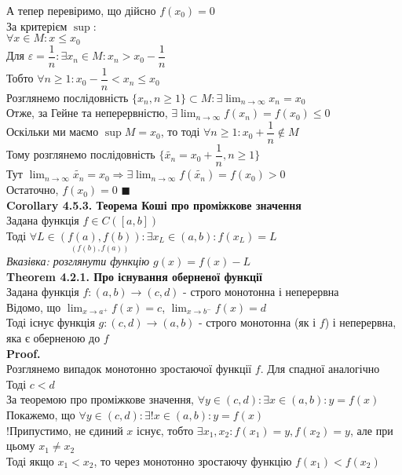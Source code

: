 \documentclass[a4paper, 14pt]{extarticle}
\def\huge{\displaystyle}
\def\bigline{\vspace{5mm}\\}
\def\th#1{\textbf{Theorem {#1}}}
\def\crl#1{\textbf{Corollary {#1}}}
\def\proof{\textbf{Proof.}\\}
\def\bigline{\vspace{5mm}\\}
\def\qed{$\blacksquare$}
\begin{document}
А тепер перевіримо, що дійсно $f(x_0) = 0$\\
За критерієм $\sup$:\\
$\forall x \in M: x \leq x_0$\\
Для $\varepsilon = \dfrac{1}{n}: \exists x_n \in M: x_n > x_0 - \dfrac{1}{n}$\\
Тобто $\forall n \geq 1: x_0 - \dfrac{1}{n} < x_n \leq x_0$\\
Розглянемо послідовність $\{x_n, n \geq 1\} \subset M: \exists \huge \lim_{n \to \infty} x_n = x_0$\\
Отже, за Гейне та неперервністю, $\huge \exists \lim_{n \to \infty} f(x_n) = f(x_0) \leq 0$
\\
Оскільки ми маємо $\sup M = x_0$, то тоді $\forall n \geq 1: x_0 + \dfrac{1}{n} \not\in M$\\
Тому розглянемо послідовність $\{\tilde{x_n} = x_0 + \dfrac{1}{n}, n \geq 1\}$\\
Тут $\huge \lim_{n \to \infty} \tilde{x_n} = x_0 \Rightarrow \exists \lim_{n \to \infty} f(\tilde{x_n}) = f(x_0) > 0$\\
Остаточно, $f(x_0) = 0$ \qed
\bigline
\crl{4.5.3. Теорема Коші про проміжкове значення}\\
Задана функція $f \in C([a,b])$\\
Тоді $\forall L \in \underset{(f(b),f(a))}{(f(a),f(b))}: \exists x_L \in (a,b): f(x_L) = L$\\
\textit{Вказівка: розглянути функцію $g(x) = f(x) - L$}
\bigline
\th{4.2.1. Про існування оберненої функції}\\
Задана функція $f: (a,b) \to (c,d)$ - строго монотонна і неперервна\\
Відомо, що $\huge \lim_{x \to a^+} f(x) = c$, $\huge \lim_{x \to b^-} f(x) = d$\\
Тоді існує функція $g: (c,d) \to (a,b)$ - строго монотонна (як і $f$) і неперервна, яка є оберненою до $f$\\
\proof
Розглянемо випадок монотонно зростаючої функції $f$. Для спадної аналогічно\\
Тоді $c < d$\\
За теоремою про проміжкове значення, $\forall y \in (c,d): \exists x \in (a,b): y = f(x)$\\
Покажемо, що $\forall y \in (c,d): \exists ! x \in (a,b): y = f(x)$\\
!Припустимо, не єдиний $x$ існує, тобто $\exists x_1, x_2: f(x_1) = y, f(x_2) = y$, але при цьому $x_1 \neq x_2$\\
Тоді якщо $x_1 < x_2$, то через монотонно зростаючу функцію $f(x_1) < f(x_2)$\\
\end{document}
